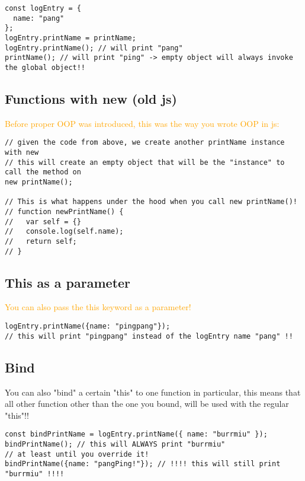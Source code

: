 \documentclass[main.tex,fontsize=6pt,paper=a4,paper=landscape,DIV=calc,]{scrartcl}
\begin{document}
\begin{multicols*}{4}
\begin{lstlisting}
const logEntry = {
  name: "pang"
};
logEntry.printName = printName;
logEntry.printName(); // will print "pang"
printName(); // will print "ping" -> empty object will always invoke the global object!!
\end{lstlisting}
\vspace{2mm}

\subsection{Functions with new (old js)}  
\textcolor{orange}{Before proper OOP was introduced, this was the way you wrote OOP in js:}\newline
\vspace{-2mm}
\begin{lstlisting}
// given the code from above, we create another printName instance with new
// this will create an empty object that will be the "instance" to call the method on
new printName();

// This is what happens under the hood when you call new printName()!
// function newPrintName() {
//   var self = {}
//   console.log(self.name);
//   return self;
// }
\end{lstlisting}
\vspace{2mm}

\subsection{This as a parameter}  
\textcolor{orange}{You can also pass the this keyword as a parameter!}\newline
\vspace{-2mm}
\begin{lstlisting}
logEntry.printName({name: "pingpang"});
// this will print "pingpang" instead of the logEntry name "pang" !!
\end{lstlisting}
\vspace{2mm}

\subsection{Bind}  
You can also "bind" a certain "this" to one function in particular, this means that all other function other than the one you bound, will be used with the regular "this"!!\newline
\vspace{-2mm}
\begin{lstlisting}
const bindPrintName = logEntry.printName({ name: "burrmiu" });
bindPrintName(); // this will ALWAYS print "burrmiu"
// at least until you override it!
bindPrintName({name: "pangPing!"}); // !!!! this will still print "burrmiu" !!!!
\end{lstlisting}
\vspace{2mm}



\end{multicols*}
\end{document}
